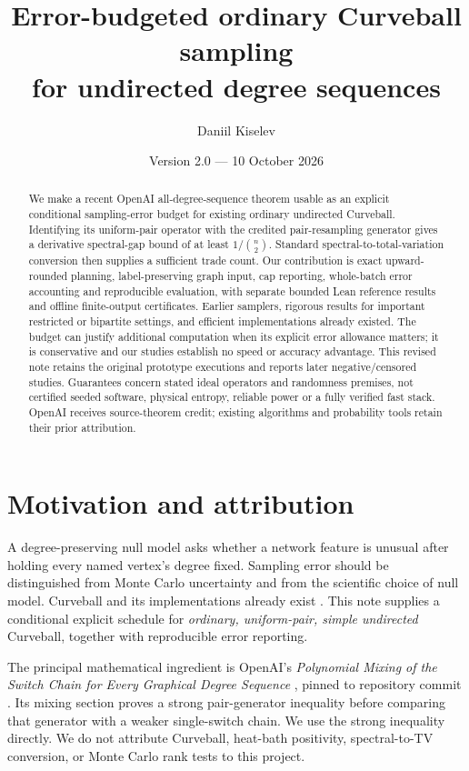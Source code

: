 \documentclass[11pt]{article}
\title{Error-budgeted ordinary Curveball sampling\\for undirected degree sequences}
\author{Daniil Kiselev}
\date{Version 2.0 --- 10 October 2026}
\newcommand{\hash}[1]{\texttt{\seqsplit{#1}}}
\begin{document}
\maketitle
\begin{abstract}
We make a recent OpenAI all-degree-sequence theorem usable as an explicit conditional sampling-error budget for existing ordinary undirected Curveball. Identifying its uniform-pair operator with the credited pair-resampling generator gives a derivative spectral-gap bound of at least $1/\binom n2$. Standard spectral-to-total-variation conversion then supplies a sufficient trade count. Our contribution is exact upward-rounded planning, label-preserving graph input, cap reporting, whole-batch error accounting and reproducible evaluation, with separate bounded Lean reference results and offline finite-output certificates. Earlier samplers, rigorous results for important restricted or bipartite settings, and efficient implementations already existed. The budget can justify additional computation when its explicit error allowance matters; it is conservative and our studies establish no speed or accuracy advantage. This revised note retains the original prototype executions and reports later negative/censored studies. Guarantees concern stated ideal operators and randomness premises, not certified seeded software, physical entropy, reliable power or a fully verified fast stack. OpenAI receives source-theorem credit; existing algorithms and probability tools retain their prior attribution.
\end{abstract}

\section{Motivation and attribution}
A degree-preserving null model asks whether a network feature is unusual after holding every named vertex's degree fixed. Sampling error should be distinguished from Monte Carlo uncertainty and from the scientific choice of null model. Curveball and its implementations already exist \cite{CBS,FAST,NK}. This note supplies a conditional explicit schedule for \emph{ordinary, uniform-pair, simple undirected} Curveball, together with reproducible error reporting.

The principal mathematical ingredient is OpenAI's \emph{Polynomial Mixing of the Switch Chain for Every Graphical Degree Sequence} \cite{OAI}, pinned to repository commit \hash{fd4aeeb2ee4fc729c18d98444fed42fd0529eeeb}. Its mixing section proves a strong pair-generator inequality before comparing that generator with a weaker single-switch chain. We use the strong inequality directly. We do not attribute Curveball, heat-bath positivity, spectral-to-TV conversion, or Monte Carlo rank tests to this project.
\end{document}
